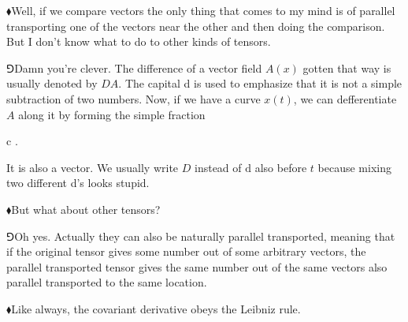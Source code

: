 \documentclass[10pt,oneside%
]{memoir}
\newenvironment{eqna}{\begin{IEEEeqnarray*}{c}}{\end{IEEEeqnarray*}\ignorespacesafterend}
\newcommand{\cder}[2]{\frac{D #1}{D #2}}
\newcommand{\dd}{\mathrm{d}}
\newcommand{\hea}{\(\blacklozenge\)\;}
\newcommand{\heb}{\(\Game\)\;}
\begin{document}
\hea Well, if we compare vectors the only thing that comes to my mind is of parallel transporting one of the vectors near the other and then doing the comparison. But I don't know what to do to other kinds of tensors.

\heb Damn you're clever. The difference of a vector field \(A(x)\) gotten that way is usually denoted by \(DA\). The capital d is used to emphasize that it is not a simple subtraction of two numbers. Now, if we have a curve \(x(t)\), we can defferentiate \(A\) along it by forming the simple fraction
\begin{eqna}
    \frac{DA}{\dd t}\doteq\cder{A}{t}.
\end{eqna}
It is also a vector. We usually write \(D\) instead of \(\dd\) also before \(t\) because mixing two different d's looks stupid.

\hea But what about other tensors?

\heb Oh yes. Actually they can also be naturally parallel transported, meaning that if the original tensor gives some number out of some arbitrary vectors, the parallel transported tensor gives the same number out of the same vectors also parallel transported to the same location.

\hea Like always, the covariant derivative obeys the Leibniz rule.

\
\end{document}

